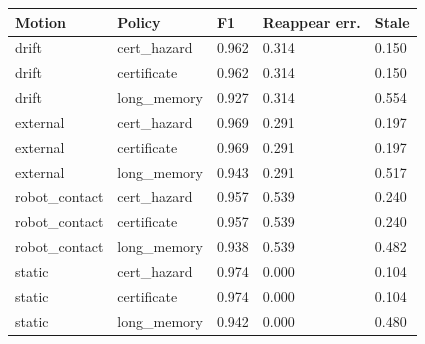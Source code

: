 \begin{tabular}{lllll}
\toprule
Motion & Policy & F1 & Reappear err. & Stale \\
\midrule
drift & cert\_hazard & 0.962 & 0.314 & 0.150 \\
drift & certificate & 0.962 & 0.314 & 0.150 \\
drift & long\_memory & 0.927 & 0.314 & 0.554 \\
external & cert\_hazard & 0.969 & 0.291 & 0.197 \\
external & certificate & 0.969 & 0.291 & 0.197 \\
external & long\_memory & 0.943 & 0.291 & 0.517 \\
robot\_contact & cert\_hazard & 0.957 & 0.539 & 0.240 \\
robot\_contact & certificate & 0.957 & 0.539 & 0.240 \\
robot\_contact & long\_memory & 0.938 & 0.539 & 0.482 \\
static & cert\_hazard & 0.974 & 0.000 & 0.104 \\
static & certificate & 0.974 & 0.000 & 0.104 \\
static & long\_memory & 0.942 & 0.000 & 0.480 \\
\bottomrule
\end{tabular}

